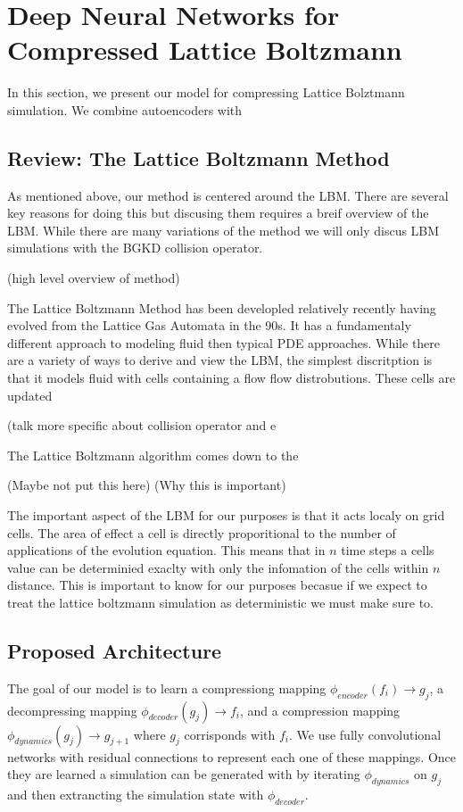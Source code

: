 \documentclass{article}
\begin{document}
\section{Deep Neural Networks for Compressed Lattice Boltzmann}

In this section, we present our model for compressing Lattice Bolztmann simulation. We combine autoencoders with

\subsection{Review: The Lattice Boltzmann Method}

As mentioned above, our method is centered around the LBM. There are several key reasons for doing this but discusing them requires a breif overview of the LBM. While there are many variations of the method we will only discus LBM simulations with the BGKD collision operator. 

(high level overview of method)

The Lattice Boltzmann Method has been developled relatively recently having evolved from the Lattice Gas Automata in the 90s. It has a fundamentaly different approach to modeling fluid then typical PDE approaches. While there are a variety of ways to derive and view the LBM, the simplest discritption is that it models fluid with cells containing a flow flow distrobutions. These cells are updated 

(talk more specific about collision operator and e

The Lattice Boltzmann algorithm comes down to the 

(Maybe not put this here)
(Why this is important)

The important aspect of the LBM for our purposes is that it acts localy on grid cells. The area of effect a cell is directly proporitional to the number of applications of the evolution equation. This means that in $n$ time steps a cells value can be determinied exaclty with only the infomation of the cells within $n$ distance. This is important to know for our purposes becasue if we expect to treat the lattice boltzmann simulation as deterministic we must make sure to. 

\subsection{Proposed Architecture}

The goal of our model is to learn a compressiong mapping $\phi_{encoder}(f_i) \rightarrow g_j$, a decompressing mapping $\phi_{decoder}(g_j) \rightarrow f_i$, and a compression mapping $\phi_{dynamics}(g_j) \rightarrow g_{j+1}$ where $g_j$ corrisponds with $f_i$. We use fully convolutional networks with residual connections to represent each one of these mappings. Once they are learned a simulation can be generated with by iterating $\phi_{dynamics}$ on $g_j$ and then extrancting the simulation state with $\phi_{decoder}$. 
\end{document}
